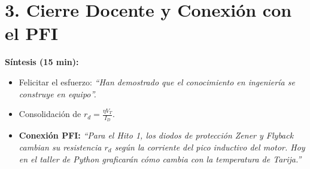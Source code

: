 \documentclass[11pt, a4paper]{article}
\begin{document}
\vspace{0.5cm}

\section*{3. Cierre Docente y Conexión con el PFI}
\textbf{Síntesis (15 min):}
\begin{itemize}
    \item Felicitar el esfuerzo: \textit{``Han demostrado que el conocimiento en ingeniería se construye en equipo''.}
    \item Consolidación de $r_d = \frac{\eta V_T}{I_D}$.
    \item \textbf{Conexión PFI:} \textit{``Para el Hito 1, los diodos de protección Zener y Flyback cambian su resistencia $r_d$ según la corriente del pico inductivo del motor. Hoy en el taller de Python graficarán cómo cambia con la temperatura de Tarija.''}
\end{itemize}
\end{document}
